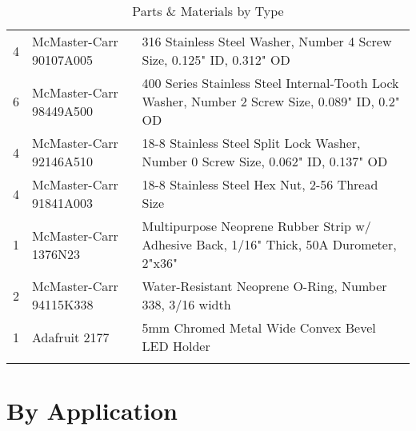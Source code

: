 \begin{longtabu}{X[1,c,m] X[6,c,m] X[9,l,m]}
  4 & McMaster-Carr 90107A005 & 316 Stainless Steel Washer, Number 4 Screw Size, 0.125" ID, 0.312" OD \\
  6 & McMaster-Carr 98449A500 & 400 Series Stainless Steel Internal-Tooth Lock Washer, Number 2 Screw Size, 0.089" ID, 0.2" OD \\
  4 & McMaster-Carr 92146A510 & 18-8 Stainless Steel Split Lock Washer, Number 0 Screw Size, 0.062" ID, 0.137" OD \\

  4 & McMaster-Carr 91841A003 & 18-8 Stainless Steel Hex Nut, 2-56 Thread Size \\

  1 & McMaster-Carr 1376N23 & Multipurpose Neoprene Rubber Strip w/ Adhesive Back, 1/16" Thick, 50A Durometer, 2"x36" \\
  2 & McMaster-Carr 94115K338 & Water-Resistant Neoprene O-Ring, Number 338, 3/16 width \\
  1 & Adafruit 2177 & 5mm Chromed Metal Wide Convex Bevel LED Holder \\

  \bhrule
\caption{Parts \& Materials by Type}
\end{longtabu}

\pagebreak
\section{By Application}

